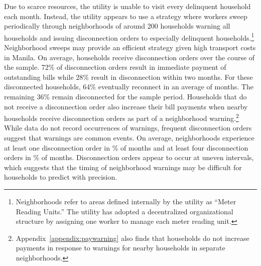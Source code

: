 \documentclass[12pt,table]{article}
\begin{document}
Due to scarce resources, the utility is unable to visit every delinquent household each month.  Instead, the utility appears to use a strategy where workers sweep periodically through neighborhoods of around 200 households warning all households and issuing disconnection orders to especially delinquent households.\footnote{Neighborhoods refer to areas defined internally by the utility as ``Meter Reading Units.''  The utility has adopted a decentralized organizational structure by assigning one worker to manage each meter reading unit.}  Neighborhood sweeps may provide an efficient strategy given high transport costs in Manila.  On average, households receive disconnection orders over the course of the sample.  72\% of disconnection orders result in immediate payment of outstanding bills while 28\% result in disconnection within two months.  For these disconnected households, 64\% eventually reconnect in an average of months.  The remaining 36\% remain disconnected for the sample period.   Households that do not receive a disconnection order also increase their bill payments when nearby households receive disconnection orders as part of a neighborhood warning.\footnote{Appendix~\ref{appendix:paywarning} also finds that households do not increase payments in response to warnings for nearby households in separate neighborhoods.}  While data do not record occurrences of warnings, frequent disconnection orders suggest that warnings are common events.  On average, neighborhoods experience at least one disconnection order in \unskip\% of months and at least four disconnection orders in \unskip\% of months.  Disconnection orders appear to occur at uneven intervals, which suggests that the timing of neighborhood warnings may be difficult for households to predict with precision.






\end{document}
